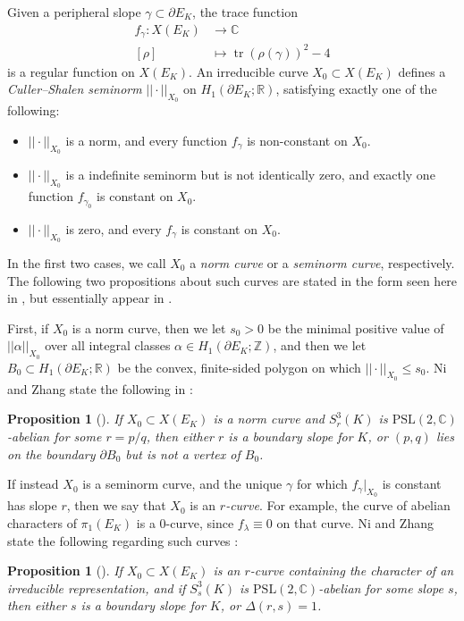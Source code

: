 \documentclass[11pt]{amsart}
\newtheorem {proposition}[theorem]{Proposition}
\numberwithin{equation}{section}
\numberwithin{theorem}{section}
\theoremstyle{definition}
\newcommand{\Z}{\mathbb{Z}}
\newcommand{\R}{\mathbb{R}}
\newcommand{\C}{\mathbb{C}}
\newcommand\PSL{\mathrm{PSL}}
\newcommand{\tr}{\operatorname{tr}}
\begin{document}
Given a peripheral slope $\gamma \subset \partial E_K$, the trace function
\begin{align*}
f_\gamma: X(E_K) &\to \C \\
[\rho] &\mapsto \tr(\rho(\gamma))^2 - 4
\end{align*}
is a regular function on $X(E_K)$.  An irreducible curve $X_0 \subset X(E_K)$ defines a \emph{Culler--Shalen seminorm} $||\cdot||_{X_0}$ on $H_1(\partial E_K;\R)$, satisfying exactly one of the following:
\begin{itemize}
\item $||\cdot||_{X_0}$ is a norm, and every function $f_\gamma$ is non-constant on $X_0$.
\item $||\cdot||_{X_0}$ is a indefinite seminorm but is not identically zero, and exactly one function $f_{\gamma_0}$ is constant on $X_0$.
\item $||\cdot||_{X_0}$ is zero, and every $f_\gamma$ is constant on $X_0$.
\end{itemize}
In the first two cases, we call $X_0$ a \emph{norm curve} or a \emph{seminorm curve}, respectively.  The following two propositions about such curves are stated in the form seen here in \cite{ni-zhang}, but essentially appear in \cite[\S6]{boyer-zhang-seminorms}.

First, if $X_0$ is a norm curve, then we let $s_0 > 0$ be the minimal positive value of $||\alpha||_{X_0}$ over all integral classes $\alpha \in H_1(\partial E_K;\Z)$, and then we let $B_0 \subset H_1(\partial E_K;\R)$ be the convex, finite-sided polygon on which $||\cdot||_{X_0} \leq s_0$. Ni and Zhang state  the following in {\cite[Theorem~2.2(4)]{ni-zhang}}: 

\begin{proposition}[] \label{prop:psl-norm}
If $X_0 \subset X(E_K)$ is a norm curve and $S^3_r(K)$ is $\PSL(2,\C)$-abelian for some $r=p/q$, then either $r$ is a boundary slope for $K$, or $(p,q)$ lies on the boundary $\partial B_0$ but is not a vertex of $B_0$.
\end{proposition}

If instead $X_0$ is a seminorm curve, and the unique $\gamma$ for which $f_\gamma|_{X_0}$ is constant has slope $r$, then we say that $X_0$ is an \emph{$r$-curve}.  For example, the curve of abelian characters of $\pi_1(E_K)$ is a $0$-curve, since $f_\lambda \equiv 0$ on that curve. Ni and Zhang state the following regarding such curves  {\cite[Theorem~2.5(3)]{ni-zhang}}:

\begin{proposition}[] \label{prop:psl2-seminorm}
If $X_0 \subset X(E_K)$ is an $r$-curve containing the character of an irreducible representation, and if $S^3_s(K)$ is $\PSL(2,\C)$-abelian for some slope $s$, then either $s$ is a boundary slope for $K$, or $\Delta(r,s) = 1$.
\end{proposition}
\end{document}
